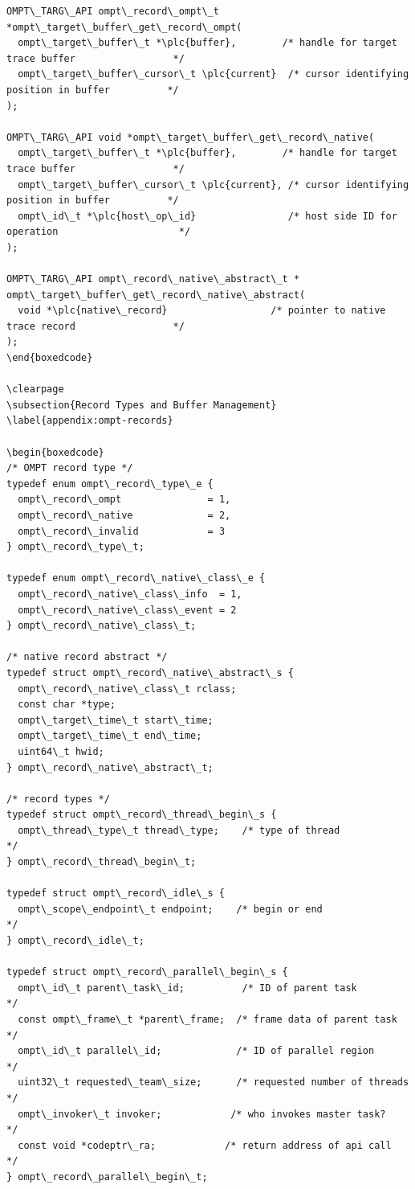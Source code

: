 \documentclass{article}
\begin{document}
\begin{boxedcode}
\begin{verbatim}
OMPT\_TARG\_API ompt\_record\_ompt\_t *ompt\_target\_buffer\_get\_record\_ompt(
  ompt\_target\_buffer\_t *\plc{buffer},        /* handle for target trace buffer                 */
  ompt\_target\_buffer\_cursor\_t \plc{current}  /* cursor identifying position in buffer          */
);
   
OMPT\_TARG\_API void *ompt\_target\_buffer\_get\_record\_native(
  ompt\_target\_buffer\_t *\plc{buffer},        /* handle for target trace buffer                 */
  ompt\_target\_buffer\_cursor\_t \plc{current}, /* cursor identifying position in buffer          */
  ompt\_id\_t *\plc{host\_op\_id}                /* host side ID for operation                     */
);
  
OMPT\_TARG\_API ompt\_record\_native\_abstract\_t *
ompt\_target\_buffer\_get\_record\_native\_abstract(
  void *\plc{native\_record}                  /* pointer to native trace record                 */
);
\end{boxedcode}

\clearpage  
\subsection{Record Types and Buffer Management}
\label{appendix:ompt-records}

\begin{boxedcode}
/* OMPT record type */
typedef enum ompt\_record\_type\_e {
  ompt\_record\_ompt               = 1,
  ompt\_record\_native             = 2,
  ompt\_record\_invalid            = 3
} ompt\_record\_type\_t; 

typedef enum ompt\_record\_native\_class\_e {
  ompt\_record\_native\_class\_info  = 1,
  ompt\_record\_native\_class\_event = 2
} ompt\_record\_native\_class\_t;

/* native record abstract */
typedef struct ompt\_record\_native\_abstract\_s {
  ompt\_record\_native\_class\_t rclass;
  const char *type;
  ompt\_target\_time\_t start\_time;
  ompt\_target\_time\_t end\_time;
  uint64\_t hwid;
} ompt\_record\_native\_abstract\_t;

/* record types */
typedef struct ompt\_record\_thread\_begin\_s {
  ompt\_thread\_type\_t thread\_type;    /* type of thread              */
} ompt\_record\_thread\_begin\_t;

typedef struct ompt\_record\_idle\_s {
  ompt\_scope\_endpoint\_t endpoint;    /* begin or end                */
} ompt\_record\_idle\_t;

typedef struct ompt\_record\_parallel\_begin\_s {
  ompt\_id\_t parent\_task\_id;          /* ID of parent task           */
  const ompt\_frame\_t *parent\_frame;  /* frame data of parent task   */
  ompt\_id\_t parallel\_id;             /* ID of parallel region       */
  uint32\_t requested\_team\_size;      /* requested number of threads */
  ompt\_invoker\_t invoker;            /* who invokes master task?    */
  const void *codeptr\_ra;            /* return address of api call  */ 
} ompt\_record\_parallel\_begin\_t;


\end{verbatim}
\end{boxedcode}
\end{document}
